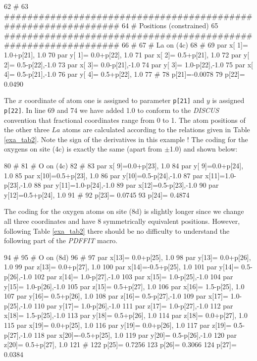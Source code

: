 \footnotesize
\begin{MacVerbatim}
     62 #
     63 ###############################################################
     64 # Positions (constrained)
     65 ###############################################################
     66 #
     67 # La on (4c)
     68 #
     69 par x[ 1]= 1.0+p[21], 1.0
     70 par y[ 1]= 0.0+p[22], 1.0
     71 par x[ 2]= 0.5+p[21], 1.0
     72 par y[ 2]= 0.5-p[22],-1.0
     73 par x[ 3]= 0.0-p[21],-1.0
     74 par y[ 3]= 1.0-p[22],-1.0
     75 par x[ 4]= 0.5-p[21],-1.0
     76 par y[ 4]= 0.5+p[22], 1.0
     77 #
     78 p[21]=-0.0078
     79 p[22]= 0.0490
\end{MacVerbatim}
\normalsize

\noindent The $x$ coordinate of atom one is assigned to parameter
{\tt p[21]} and $y$ is assigned {\tt p[22]}. In line 69 and 74 we
have added 1.0 to conform to the {\it DISCUS} convention that
fractional coordinates range from 0 to 1. The atom positions of
the other three $La$ atoms are calculated according to the
relations given in Table \ref{exa_tab2}. Note the sign of the
derivatives in this example ! The coding for the oxygens on site
(4c) is exactly the same (apart from $\pm$1.0) and shown below:

\footnotesize
\begin{MacVerbatim}
     80 #
     81 # O on (4c)
     82 #
     83 par x[ 9]=0.0+p[23], 1.0
     84 par y[ 9]=0.0+p[24], 1.0
     85 par x[10]=0.5+p[23], 1.0
     86 par y[10]=0.5-p[24],-1.0
     87 par x[11]=1.0-p[23],-1.0
     88 par y[11]=1.0-p[24],-1.0
     89 par x[12]=0.5-p[23],-1.0
     90 par y[12]=0.5+p[24], 1.0
     91 #
     92 p[23]= 0.0745
     93 p[24]= 0.4874
\end{MacVerbatim}
\normalsize

\noindent The coding for the oxygen atoms on site (8d) is slightly
longer since we change all three coordinates and have 8
symmetrically equivalent positions. However, following Table
\ref{exa_tab2} there should be no difficulty to understand the
following part of the {\it PDFFIT} macro.

\footnotesize
\begin{MacVerbatim}
     94 #
     95 # O on (8d)
     96 #
     97 par x[13]= 0.0+p[25], 1.0
     98 par y[13]= 0.0+p[26], 1.0
     99 par z[13]= 0.0+p[27], 1.0
    100 par x[14]=-0.5+p[25], 1.0
    101 par y[14]= 0.5-p[26],-1.0
    102 par z[14]= 1.0-p[27],-1.0
    103 par x[15]= 1.0-p[25],-1.0
    104 par y[15]= 1.0-p[26],-1.0
    105 par z[15]= 0.5+p[27], 1.0
    106 par x[16]= 1.5-p[25], 1.0
    107 par y[16]= 0.5+p[26], 1.0
    108 par z[16]= 0.5-p[27],-1.0
    109 par x[17]= 1.0-p[25],-1.0
    110 par y[17]= 1.0-p[26],-1.0
    111 par z[17]= 1.0-p[27],-1.0
    112 par x[18]= 1.5-p[25],-1.0
    113 par y[18]= 0.5+p[26], 1.0
    114 par z[18]= 0.0+p[27], 1.0
    115 par x[19]= 0.0+p[25], 1.0
    116 par y[19]= 0.0+p[26], 1.0
    117 par z[19]= 0.5-p[27],-1.0
    118 par x[20]=-0.5+p[25], 1.0
    119 par y[20]= 0.5-p[26],-1.0
    120 par z[20]= 0.5+p[27], 1.0
    121 #
    122 p[25]= 0.7256
    123 p[26]= 0.3066
    124 p[27]= 0.0384
\end{MacVerbatim}
\normalsize

